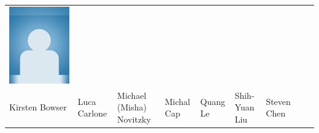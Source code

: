 \documentclass[landscape,a0paper,fontscale=0.292]{baposter}
\begin{document}
\begin{poster}
{\begin{center}
\begin{tabularx}{\linewidth}{X X X X X X X X X}
{\centering \includegraphics[width=0.65\linewidth]{MISSING.jpg}}&
&\\

{\tiny \centering Kirsten Bowser }& {\tiny \centering Luca Carlone }& {\tiny \centering Michael (Misha) Novitzky }& {\tiny \centering Michal Cap }& {\tiny \centering Quang Le }& {\tiny \centering Shih-Yuan Liu }& {\tiny \centering Steven Chen }& &\\

 
            \end{tabularx}
            \end{center}
            
            }
\end{poster}
\end{document}
